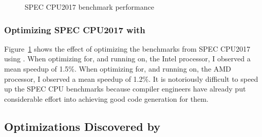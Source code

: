 \begin{figure}[tbp]
  \centering
  \hfill
  \caption{SPEC CPU2017 benchmark performance}
  \label{fig:spec}
\end{figure}

\subsubsection{Optimizing SPEC CPU2017 with \minotaur{}}

Figure~\ref{fig:spec} shows the effect of optimizing the benchmarks
from SPEC CPU2017 using \minotaur.
%
When optimizing for, and running on, the Intel processor, I observed
a mean speedup of 1.5\%.
%
When optimizing for, and running on, the AMD processor, I observed a
mean speedup of 1.2\%.
%
It is notoriously difficult to speed up the SPEC CPU benchmarks
because compiler engineers have already put considerable effort into
achieving good code generation for them.



\subsection{Optimizations Discovered by \minotaur}
\label{sec:examples}

